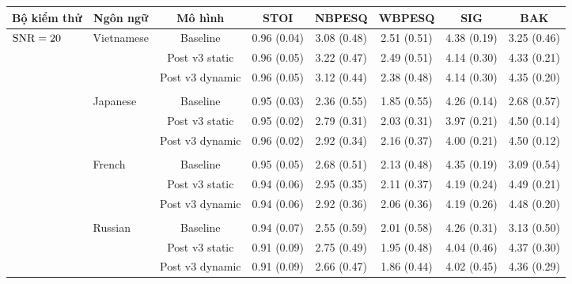 		\begin{sidewaystable} \ContinuedFloat
			\centering
			\begin{subtable}{\textwidth}
				\centering
				\begin{tabular}{llcccccc}
					\hline
					\multicolumn{1}{c}{\textbf{Bộ kiểm thử}}	& \multicolumn{1}{c}{\textbf{Ngôn ngữ}}	& \textbf{Mô hình}	& \textbf{STOI}	& \textbf{NBPESQ}	& \textbf{WBPESQ}	& \textbf{SIG}	& \textbf{BAK} \\
					\hline
					\multirow{27}{*}{$\text{SNR}=20$}       & \multirow{3}{*}{Vietnamese}     &Baseline       & 0.96 (0.04)   & 3.08 (0.48)   & 2.51 (0.51)   & 4.38 (0.19)   & 3.25 (0.46) \\
					&               &Post v3 static & 0.96 (0.05)   & 3.22 (0.47)   & 2.49 (0.51)   & 4.14 (0.30)   & 4.33 (0.21) \\
					&				&Post v3 dynamic        & 0.96 (0.05)   & 3.12 (0.44)   & 2.38 (0.48)   & 4.14 (0.30)   & 4.35 (0.20) \\
					&&&&&&&\\
					& \multirow{3}{*}{Japanese}     &Baseline       & 0.95 (0.03)   & 2.36 (0.55)   & 1.85 (0.55)   & 4.26 (0.14)   & 2.68 (0.57) \\
					&               &Post v3 static & 0.95 (0.02)   & 2.79 (0.31)   & 2.03 (0.31)   & 3.97 (0.21)   & 4.50 (0.14) \\
					&               &Post v3 dynamic        & 0.96 (0.02)   & 2.92 (0.34)   & 2.16 (0.37)   & 4.00 (0.21)   & 4.50 (0.12) \\
					&&&&&&&\\
					& \multirow{3}{*}{French}       &Baseline       & 0.95 (0.05)   & 2.68 (0.51)   & 2.13 (0.48)   & 4.35 (0.19)   & 3.09 (0.54) \\
					&               &Post v3 static & 0.94 (0.06)   & 2.95 (0.35)   & 2.11 (0.37)   & 4.19 (0.24)   & 4.49 (0.21) \\
					&               &Post v3 dynamic        & 0.94 (0.06)   & 2.92 (0.36)   & 2.06 (0.36)   & 4.19 (0.26)   & 4.48 (0.20) \\
					&&&&&&&\\
					& \multirow{3}{*}{Russian}      &Baseline       & 0.94 (0.07)   & 2.55 (0.59)   & 2.01 (0.58)   & 4.26 (0.31)   & 3.13 (0.50) \\
					&               &Post v3 static & 0.91 (0.09)   & 2.75 (0.49)   & 1.95 (0.48)   & 4.04 (0.46)   & 4.37 (0.30) \\
					&               &Post v3 dynamic        & 0.91 (0.09)   & 2.66 (0.47)   & 1.86 (0.44)   & 4.02 (0.45)   & 4.36 (0.29) \\

\end{tabular}
\end{subtable}
\end{sidewaystable}
